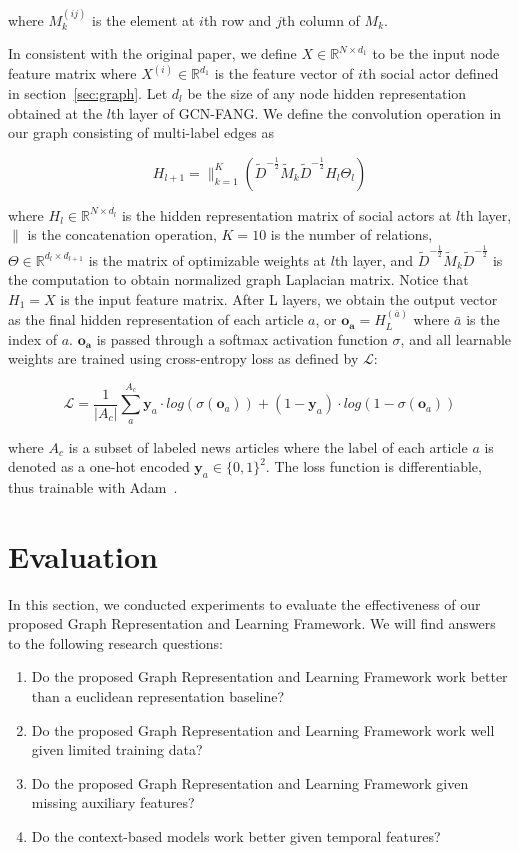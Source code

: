 \documentclass[fyp]{socreport}
\theoremstyle{definition}
\theoremstyle{hypothesis}
\begin{document}
where $M^{(ij)}_k$ is the element at $i$th row and $j$th column of $M_k$.

In consistent with the original paper, we define $X\in \mathbb{R}^{N\times d_1}$ to be the input node feature matrix where $X^{(i)}\in \mathbb{R}^{d_1}$ is the feature vector of $i$th social actor defined in section~\ref{sec:graph}. Let $d_l$ be the size of any node hidden representation obtained at the $l$th layer of GCN-FANG. We define the convolution operation in our graph consisting of multi-label edges as

\begin{equation}
    H_{l+1} = \parallel^{K}_{k=1}(\tilde{D}^{-\frac{1}{2}}\tilde{M}_k\tilde{D}^{-\frac{1}{2}}H_l\Theta_l)
\end{equation}

where $H_l\in \mathbb{R}^{N\times d_l}$ is the hidden representation matrix of social actors at $l$th layer, $\parallel$ is the concatenation operation, $K=10$ is the number of relations, $\Theta\in\mathbb{R}^{d_l\times d_{l+1}}$ is the matrix of optimizable weights at $l$th layer, and $\tilde{D}^{-\frac{1}{2}}\tilde{M}_k\tilde{D}^{-\frac{1}{2}}$ is the computation to obtain normalized graph Laplacian matrix. Notice that $H_1=X$ is the input feature matrix. After L layers, we obtain the output vector as the final hidden representation of each article $a$, or $\boldsymbol{o_a}=H^{(\bar{a})}_L$ where $\bar{a}$ is the index of $a$. $\boldsymbol{o_a}$ is passed through a softmax activation function $\sigma$, and all learnable weights are trained using cross-entropy loss as defined by $\mathcal{L}$:

\begin{equation}\label{eq:overall_loss}
    \mathcal{L}=\frac{1}{|A_c|}\sum^{A_c}_{a}\boldsymbol{y}_{a} \cdot log(\sigma(\boldsymbol{o}_{a}))+(1-\boldsymbol{y}_{a})\cdot log(1-\sigma(\boldsymbol{o}_{a}))
\end{equation}

where $A_c$ is a subset of labeled news articles where the label of each article $a$ is denoted as a one-hot encoded $\boldsymbol{y}_{a}\in \{0, 1\}^{2}$. The loss function is differentiable, thus trainable with Adam~\cite{kingma2014adam}.

\chapter{Evaluation}
In this section, we conducted experiments to evaluate the effectiveness of our proposed Graph Representation and Learning Framework. We will find answers to the following research questions:
\begin{enumerate}
    \item Do the proposed Graph Representation and Learning Framework work better than a euclidean representation baseline?
    \item Do the proposed Graph Representation and Learning Framework work well given limited training data?
    \item Do the proposed Graph Representation and Learning Framework given missing auxiliary features?
    \item Do the context-based models work better given temporal features?
\end{enumerate}
\end{document}
